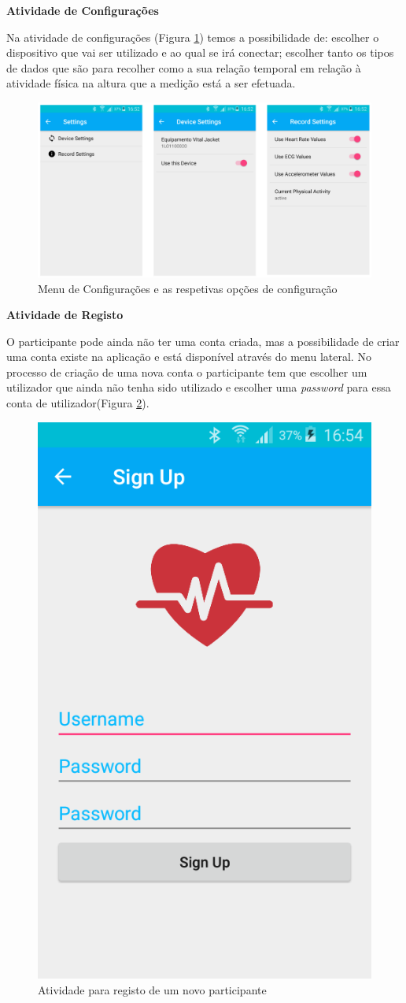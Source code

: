 \par
\textbf{Atividade de Configurações}
\par
Na atividade de configurações (Figura \ref{f:settings}) temos a possibilidade de: escolher o dispositivo que vai ser utilizado e ao qual se irá conectar; escolher tanto os tipos de dados que são para recolher como a sua relação temporal em relação à atividade física na altura que a medição está a ser efetuada.
\begin{figure}[H]
\centering
\includegraphics[height=0.3\textwidth]{imgs/settings.png}
\caption[Menu de Configurações e as respetivas opções de configuração]{Menu de Configurações e as respetivas opções de configuração}
\label{f:settings}
\end{figure}

\par
\textbf{Atividade de Registo}
\par
O participante pode ainda não ter uma conta criada, mas a possibilidade de criar uma conta existe na aplicação e está disponível através do menu lateral. No processo de criação de uma nova conta o participante tem que escolher um utilizador que ainda não tenha sido utilizado e escolher uma \textit{password} para essa conta de utilizador(Figura \ref{f:createaccount}).
\begin{figure}[H]
\centering
\includegraphics[height=0.3\textwidth]{imgs/signup_app.png}
\caption[Atividade para registo de um novo participante]{Atividade para registo de um novo participante}
\label{f:createaccount}
\end{figure}

